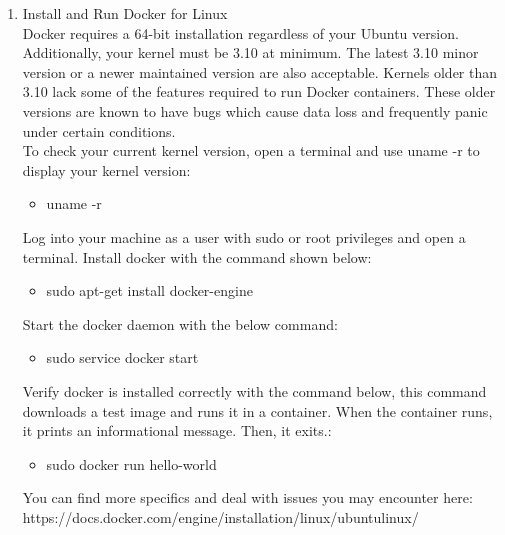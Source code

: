 \documentclass[draftclsnofoot,10pt,onecolumn]{IEEEtran} %
\begin{document}
\begin{enumerate}
	\item Install and Run Docker for Linux \\
	Docker requires a 64-bit installation regardless of your Ubuntu version. Additionally, your kernel must be 3.10 at minimum. 
	The latest 3.10 minor version or a newer maintained version are also acceptable. Kernels older than 3.10 lack some of the 
	features required to run Docker containers. These older versions are known to have bugs which cause data loss and frequently 
	panic under certain conditions.\\
	
	To check your current kernel version, open a terminal and use uname -r to display your kernel version:
	
	\begin{itemize}
		\item uname -r \\
	\end{itemize}
	
	Log into your machine as a user with sudo or root privileges and open a terminal. Install docker with the command shown below:
	
	\begin{itemize}
		\item sudo apt-get install docker-engine \\
	\end{itemize}
	
	Start the docker daemon with the below command:
	
	\begin{itemize}
		\item sudo service docker start \\
	\end{itemize}
	
	Verify docker is installed correctly with the command below, this command downloads a test image and runs it in a container. 
	When the container runs, it prints an informational message. Then, it exits.:
	
	\begin{itemize}
		\item sudo docker run hello-world \\
	\end{itemize}
	
	You can find more specifics and deal with issues you may encounter here: \\
	https://docs.docker.com/engine/installation/linux/ubuntulinux/ \\
	

\end{enumerate}
\end{document}
